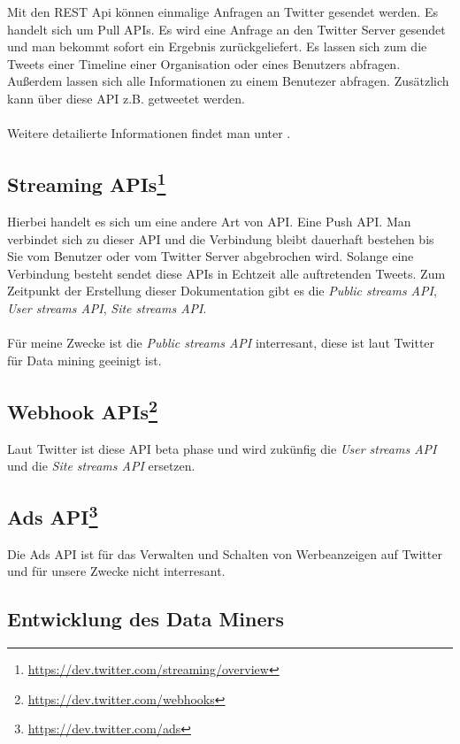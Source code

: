 Mit den REST Api können einmalige Anfragen an Twitter gesendet werden. Es handelt sich um Pull APIs.
Es wird eine Anfrage an den Twitter Server gesendet und man bekommt sofort ein Ergebnis zurückgeliefert.
Es lassen sich zum die Tweets einer Timeline einer Organisation oder eines Benutzers abfragen.
Außerdem lassen sich alle Informationen zu einem Benutezer abfragen. Zusätzlich kann über diese API z.B. getweetet werden.
\\
\\
Weitere detailierte Informationen findet man unter .

\subsection{Streaming APIs\footnote{\url{https://dev.twitter.com/streaming/overview}}}

Hierbei handelt es sich um eine andere Art von API. Eine Push API. Man verbindet sich zu dieser API und die Verbindung bleibt dauerhaft bestehen
bis Sie vom Benutzer oder vom Twitter Server abgebrochen wird. Solange eine Verbindung besteht sendet diese APIs in Echtzeit alle auftretenden Tweets.
Zum Zeitpunkt der Erstellung dieser Dokumentation gibt es die \emph{Public streams API}, \emph{User streams API}, \emph{Site streams API}.
\\
\\
Für meine Zwecke ist die \emph{Public streams API} interresant, diese ist laut Twitter für Data mining geeinigt ist.

\subsection{Webhook APIs\footnote{\url{https://dev.twitter.com/webhooks}}}

Laut Twitter ist diese API beta phase und wird zukünfig die \emph{User streams API} und die \emph{Site streams API} ersetzen.

\subsection{Ads API\footnote{\url{https://dev.twitter.com/ads}}}

Die Ads API ist für das Verwalten und Schalten von Werbeanzeigen auf Twitter und für unsere Zwecke nicht interresant.

\subsection{Entwicklung des Data Miners}


